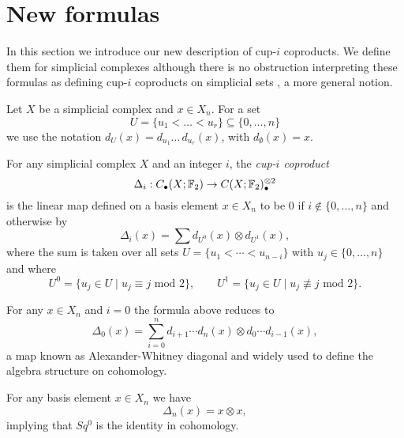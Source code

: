 
\section{New formulas} \label{s:formulas}

In this section we introduce our new description of cup-$i$ coproducts.
We define them for simplicial complexes although there is no obstruction interpreting these formulas as defining cup-$i$ coproducts on simplicial sets \cite{friedman2012simplicial}, a more general notion.

Let $X$ be a simplicial complex and $x \in X_n$.
For a set
\begin{equation*}
U = \{u_1 < \dots < u_r\} \subseteq \{0, \dots, n\}
\end{equation*}
we use the notation $d_U(x) = d_{u_1} \ldots\, d_{u_r}(x)$, with $d_{\emptyset}(x) = x$.

\begin{definition} \label{d:cup-i coproducts}	
	For any simplicial complex $X$ and an integer $i$, the \textit{cup-$i$ coproduct}
	\begin{equation*}
	\Delta_i : C_\bullet(X; \mathbb{F}_2) \to C(X; \mathbb{F}_2)^{\otimes 2}_\bullet
	\end{equation*}
	is the linear map defined on a basis element $x \in X_n$ to be $0$ if $i \not\in \{0, \dots, n\}$ and otherwise by
	\begin{equation} \label{equation: simplicial cup-i coproducts}
	\Delta_i(x) = \sum d_{U^0}(x) \otimes d_{U^1}(x),
	\end{equation}
	where the sum is taken over all sets $U = \{u_1 < \cdots < u_{n-i}\}$ with $u_j \in \{0, \dots, n\}$ and where
	\begin{equation*}
	U^0 = \{u_j \in U\mid u_j \equiv j \text{ mod } 2\}, \qquad
	U^1 = \{u_j \in U\mid u_j \not\equiv j \text{ mod } 2\}.
	\end{equation*}
\end{definition}

\begin{example}
	For any $x \in X_n$ and $i = 0$ the formula above reduces to
	\begin{equation*}
	\Delta_0(x) = \sum_{i=0}^n d_{i+1} \cdots d_{n}(x) \otimes d_{0} \cdots d_{i-1}(x),
	\end{equation*}
	a map known as Alexander-Whitney diagonal and widely used to define the algebra structure on cohomology.
\end{example}

\begin{example}
	For any basis element $x \in X_n$ we have
	\begin{equation*}
	\Delta_n(x) = x \otimes x,
	\end{equation*}
	implying that $Sq^0$ is the identity in cohomology.
\end{example}

